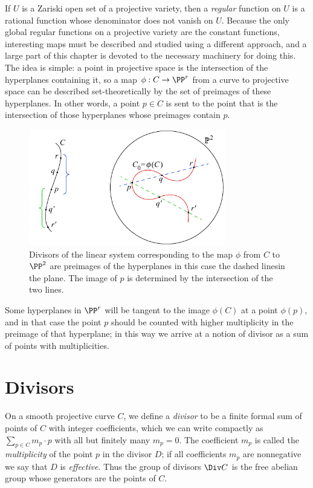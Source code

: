 If $U$ is a Zariski open set of a projective variety, then a \emph{regular} function on $U$
is a rational function whose denominator does not vanish on $U$.
Because the only global regular functions on a projective variety are the  constant functions, 
interesting maps must be described and studied using
a different approach, and a large part of this chapter is devoted to the necessary machinery for doing this. The idea is simple: a point in projective space is the intersection of the hyperplanes containing it, so a map $\phi: C\to \PP^r$ from a curve to projective space can be described set-theoretically
by the set of preimages of these hyperplanes. 
In other words, a point $p\in C$ is sent to the point
that is the intersection of those hyperplanes whose preimages contain $p$.
 
\begin{figure}[b]
\centerline {\includegraphics[height=2in]{"main/Fig01-1"}}
 \caption{Divisors of the linear system corresponding to the map
   $\phi$ from $C$ 
to $\PP^2$ are preimages of the hyperplanes\emdash
   in this case the dashed lines\emdash in the plane.
 The image of $p$ is determined by the intersection of the two lines.
}
\end{figure}


Some hyperplanes in $\PP^{r}$ will be tangent to the image $\phi(C)$ at a point $\phi(p)$, and in that case the point $p$ should be counted with higher multiplicity in the preimage of that hyperplane; in
this way we arrive at a notion of divisor as a sum of points with multiplicities.

\section{Divisors}

On a smooth projective curve $C$, we define a \emph{divisor} to be a
finite formal sum of points of $C$ with integer coefficients, which we
can write compactly as $\sum_{p\in C} m_p\cdot p$ with all but
finitely many $m_p=0$.  The coefficient $m_p$ is called the
\emph{multiplicity} of the point $p$ in the divisor $D$; if all
coefficients $m_p$ are nonnegative we say that $D$ is
\emph{effective}. Thus the group of divisors $\Div C$ is the free
abelian group whose generators
%
%
%
are the points of $C$.


